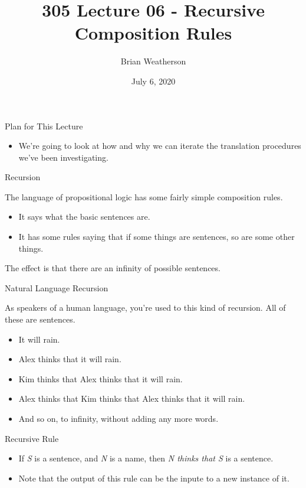 \documentclass[
  ignorenonframetext,
]{beamer}
\title{305 Lecture 06 - Recursive Composition Rules}
\author{Brian Weatherson}
\date{July 6, 2020}
\providecommand{\tightlist}{%
  \setlength{\itemsep}{0pt}\setlength{\parskip}{0pt}}
\renewcommand{\,}{\text{, }}
\begin{document}
\frame{\titlepage}

\begin{frame}{Plan for This Lecture}
\protect\hypertarget{plan-for-this-lecture}{}

\begin{itemize}
\tightlist
\item
  We're going to look at how and why we can iterate the translation
  procedures we've been investigating.
\end{itemize}

\end{frame}

\begin{frame}{Recursion}
\protect\hypertarget{recursion}{}

The language of propositional logic has some fairly simple composition
rules.

\begin{itemize}
\tightlist
\item
  It says what the basic sentences are.
\item
  It has some rules saying that if some things are sentences, so are
  some other things.
\end{itemize}

The effect is that there are an infinity of possible sentences.

\end{frame}

\begin{frame}{Natural Language Recursion}
\protect\hypertarget{natural-language-recursion}{}

As speakers of a human language, you're used to this kind of recursion.
All of these are sentences.

\begin{itemize}[<+->]
\tightlist
\item
  It will rain.
\item
  Alex thinks that it will rain.
\item
  Kim thinks that Alex thinks that it will rain.
\item
  Alex thinks that Kim thinks that Alex thinks that it will rain.
\item
  And so on, to infinity, without adding any more words.
\end{itemize}

\end{frame}

\begin{frame}{Recursive Rule}
\protect\hypertarget{recursive-rule}{}

\begin{itemize}
\tightlist
\item
  If \emph{S} is a sentence, and \emph{N} is a name, then \emph{N thinks
  that S} is a sentence.
\item
  Note that the output of this rule can be the inpute to a new instance
  of it.
\end{itemize}

\end{frame}
\end{document}
